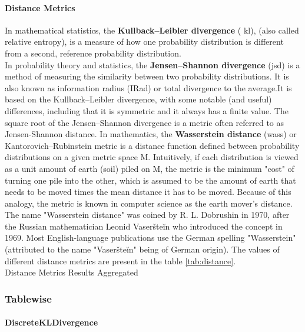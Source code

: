 \documentclass{article}
\begin{document}
\paragraph{Distance Metrics}
In mathematical statistics, the \textbf{Kullback–Leibler divergence} ( \acrshort{kl}),  (also called relative entropy), is a measure of how one probability distribution is different from a second, reference probability distribution.\\
In probability theory and statistics, the \textbf{Jensen–Shannon divergence} (\acrshort{jsd}) is a method of measuring the similarity between two probability distributions. It is also known as information radius (IRad) or total divergence to the average.It is based on the Kullback–Leibler divergence, with some notable (and useful) differences, including that it is symmetric and it always has a finite value. The square root of the Jensen–Shannon divergence is a metric often referred to as Jensen-Shannon distance.     
In mathematics, the \textbf{Wasserstein distance} (\acrshort{wass}) or Kantorovich–Rubinstein metric is a distance function defined between probability distributions on a given metric space M.
Intuitively, if each distribution is viewed as a unit amount of earth (soil) piled on M, the metric is the minimum "cost" of turning one pile into the other, which is assumed to be the amount of earth that needs to be moved times the mean distance it has to be moved. Because of this analogy, the metric is known in computer science as the earth mover's distance.
The name "Wasserstein distance" was coined by R. L. Dobrushin in 1970, after the Russian mathematician Leonid Vaseršteĭn who introduced the concept in 1969. Most English-language publications use the German spelling "Wasserstein" (attributed to the name "Vaseršteĭn" being of German origin). The values of different distance metrics are present in the table \ref{tab:distance}.\\

\caption{Distance Metrics Results Aggregated}\label{tab:distance}   
    

\subsubsection{Tablewise}

\paragraph{DiscreteKLDivergence}
\end{document}
